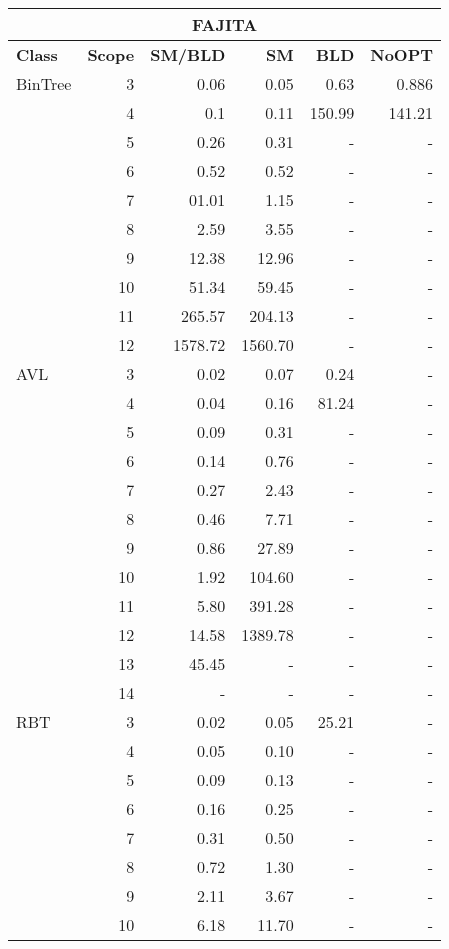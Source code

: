 \begin{table}[H]
\scriptsize
\centering
\label{tab:results-obj1}
\begin{tabular}{ l r | r | r | r | r  }
  \toprule
  \multicolumn{6}{c}{\textbf{FAJITA}} \\
  \midrule 
  \textbf{Class} & \textbf{Scope} & \textbf{SM/BLD} & \textbf{SM}  & \textbf{BLD} & \textbf{NoOPT}  \\
  \midrule
  BinTree
&	3	&	0.06	&	0.05	&	0.63	&	0.886	\\
& 4	&	0.1	&	0.11	&	150.99	&	141.21	\\
&	5	&	0.26	&	0.31	&	-	&	-	\\
&	6	&	0.52	&	0.52	&	-	&	-	\\
&	7	&	01.01	&	1.15	&	-	&	-	\\
&	8	&	2.59	&	3.55	&	-	&	-	\\
&	9	&	12.38	&	12.96	&	-	&	-	\\
&	10	&	51.34	&	59.45	&	-	&	-	\\
&	11	&	265.57	&	204.13	&	-	&	-	\\
&	12	&	1578.72	&	1560.70	&	-	&	-	\\
  \midrule
  AVL
&	3	&	0.02	&	0.07	&	0.24	&	- \\
&	4	&	0.04	&	0.16	&	81.24	&	- \\
&	5	&	0.09	&	0.31	&	-	&	-	\\
&	6	&	0.14	&	0.76	&	-	&	-	\\
&	7	&	0.27	&	2.43	&	-	&	-	\\
&	8	&	0.46	&	7.71	&	-	&	-	\\
&	9	&	0.86	&	27.89	&	-	&	-	\\
&	10	&	1.92	&	104.60	&	-	&	-	\\
&	11	&	5.80	&	391.28	&	-	&	-	\\
&	12	&	14.58	&	1389.78	&	-	&	-	\\
&	13	&	45.45	&	-	&	-	&	-	\\
&	14	&	-	&	-	&	-	&	-	\\
  \midrule
  RBT
&	3	&	0.02	&	0.05	&	25.21	&	-	\\
&	4	&	0.05	&	0.10	&	-	&	-	\\
&	5	&	0.09	&	0.13	&	-	&	-	\\
&	6	&	0.16	&	0.25	&	-	&	-	\\
&	7	&	0.31	&	0.50	&	-	&	-	\\
&	8	&	0.72	&	1.30	&	-	&	-	\\
&	9	&	2.11	&	3.67	&	-	&	-	\\
&	10	&	6.18	&	11.70	&	-	&	-	\\

\end{tabular}
\end{table}
